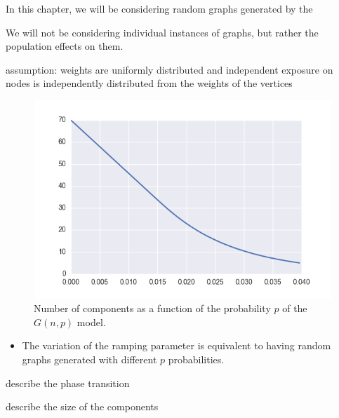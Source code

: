 In this chapter, we will be considering random graphs generated by the 

We will not be considering individual instances of graphs, but rather the population effects on them.



assumption:
weights are uniformly distributed and independent
exposure on nodes is independently distributed from the weights of the vertices


\begin{figure}[tb]
	\centering
	\includegraphics[]{figures/gnp_number_components.png}
	\caption{Number of components as a function of the probability $p$ of the $G(n,p)$ model.}
	\label{fig:figure1}
\end{figure}


\begin{itemize}
	\item The variation of the ramping parameter is equivalent to having random graphs generated with different $p$ probabilities.
\end{itemize}


describe the phase transition


describe the size of the components


